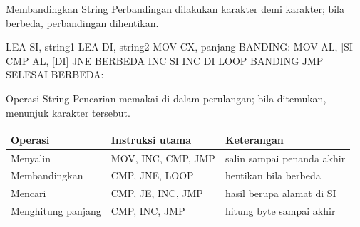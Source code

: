 \documentclass[aspectratio=169,11pt]{beamer}
\begin{document}
\begin{frame}[fragile]{Membandingkan String}
\small
Perbandingan dilakukan karakter demi karakter; bila berbeda,
perbandingan dihentikan.

\vspace{0.2em}
\begin{kodeasm}[numbers=none]
LEA SI, string1
LEA DI, string2
MOV CX, panjang
BANDING:
    MOV AL, [SI]
    CMP AL, [DI]
    JNE BERBEDA
    INC SI
    INC DI
    LOOP BANDING
    JMP SELESAI
BERBEDA:
\end{kodeasm}
\end{frame}

\begin{frame}{Operasi String}
\footnotesize
Pencarian memakai  di dalam perulangan; bila ditemukan,
 menunjuk karakter tersebut.

\vspace{0.2em}
\begin{center}
\begin{tabular}{@{}>{\raggedright\arraybackslash}p{2.8cm}
    >{\raggedright\arraybackslash}p{4.2cm}
    >{\raggedright\arraybackslash}p{5.8cm}@{}}
    \toprule
    \textbf{Operasi} & \textbf{Instruksi utama} &
    \textbf{Keterangan} \\
    \midrule
    Menyalin & MOV, INC, CMP, JMP & salin sampai penanda akhir \\
    \addlinespace
    Membandingkan & CMP, JNE, LOOP & hentikan bila berbeda \\
    \addlinespace
    Mencari & CMP, JE, INC, JMP & hasil berupa alamat di SI \\
    \addlinespace
    Menghitung panjang & CMP, INC, JMP & hitung byte sampai akhir \\
    \bottomrule
\end{tabular}
\end{center}
\end{frame}
\end{document}
